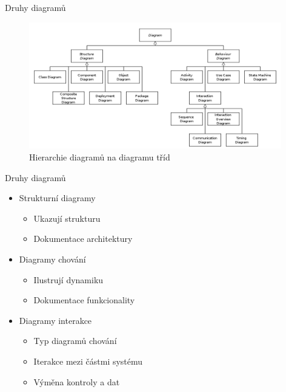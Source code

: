 
\begin{frame}{Druhy diagramů}

\begin{figure}
	\includegraphics[width=110mm]{img/diagramy2.png}
	\caption{Hierarchie diagramů na diagramu tříd}
\end{figure}
	
\end{frame}


\begin{frame}{Druhy diagramů}

\begin{itemize}
	\item<+-> Strukturní diagramy
	\onslide<+->
	\begin{itemize}
		\item Ukazují strukturu
		\item Dokumentace architektury
	\end{itemize}
	
	\item<+-> Diagramy chování
	\onslide<+->
	\begin{itemize}
		\item Ilustrují dynamiku
		\item Dokumentace funkcionality
	\end{itemize}

	\item<+-> Diagramy interakce
	\onslide<+->
	\begin{itemize}
		\item Typ diagramů chování
		\item Iterakce mezi částmi systému
		\item Výměna kontroly a dat
	\end{itemize}

\end{itemize}
	
\end{frame}


